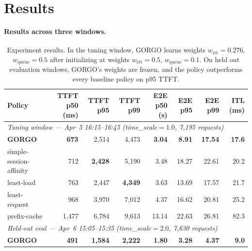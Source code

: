 \documentclass{article}
\begin{document}
\FloatBarrier
\section{Results}
\label{sec:results}
\label{sec:results:p95}


\paragraph{Results across three windows.}

\begin{table}[htbp]
\centering
\small
\caption{Experiment results. In the tuning window, GORGO learns weights $w_{\mathrm{rtt}}{=}0.276$, $w_{\mathrm{queue}}{=}0.5$ after initializing
at weights $w_{\mathrm{rtt}}{=}0.5$, $w_{\mathrm{queue}}{=}0.1$. On held out evaluation windows, GORGO's weights are frozen, and
the policy outperforms every baseline policy on p95 TTFT.}
\label{tab:results}
\setlength{\tabcolsep}{2.7pt}
\begin{tabular}{lrrrrrrr}
\toprule
Policy & TTFT p50 (ms) & TTFT p95 & TTFT p99 & E2E p50 (s) & E2E p95 & E2E p99 & ITL (ms) \\
\midrule
\multicolumn{8}{l}{\textit{Tuning window --- Apr~5 16:15--16:45 (time\_scale${=}1.0$, 7{,}195 requests)}} \\
\midrule
\textbf{GORGO}          & \textbf{673} & 2{,}514          & 4{,}473          & \textbf{3.04}  & \textbf{8.91}  & \textbf{17.54} & \textbf{17.6} \\
simple-session-affinity & 712          & \textbf{2{,}428} & 5{,}190          & 3.48           & 18.27          & 22.61          & 20.2 \\
least-load              & 763          & 2{,}447          & \textbf{4{,}349} & 3.63           & 13.69          & 17.57          & 21.7 \\
least-request           & 968          & 3{,}970          & 7{,}012          & 4.37           & 16.62          & 20.81          & 25.2 \\
prefix-cache            & 1{,}477      & 6{,}784          & 9{,}613          & 13.14          & 22.63          & 26.81          & 82.3 \\
\midrule
\multicolumn{8}{l}{\textit{Held-out eval --- Apr~6 15:05--15:35 (time\_scale${=}2.0$, 7{,}630 requests)}} \\
\midrule
\textbf{GORGO}          & \textbf{491} & \textbf{1{,}584} & \textbf{2{,}222} & \textbf{1.80}  & \textbf{3.28}  & \textbf{4.37}  & \textbf{9.0} \\

\end{tabular}
\end{table}
\end{document}
